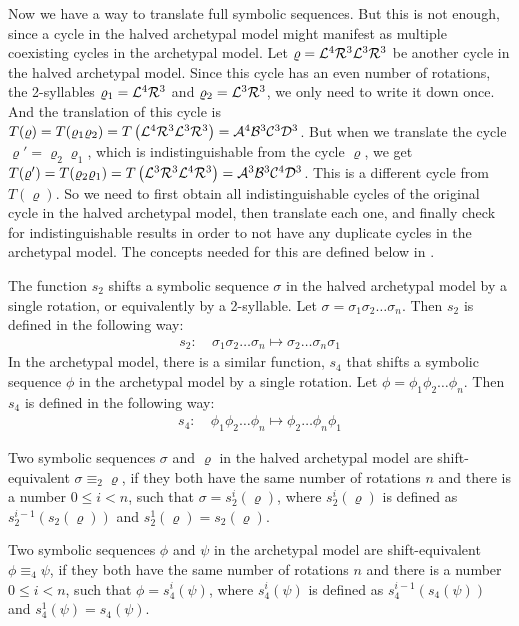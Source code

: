 Now we have a way to translate full symbolic sequences.
But this is not enough, since a cycle in the halved archetypal model might manifest as multiple coexisting cycles in the archetypal model.
Let $\varrho = \mathcal{L}^4\mathcal{R}^3\mathcal{L}^3\mathcal{R}^3$ be another cycle in the halved archetypal model.
Since this cycle has an even number of rotations, the 2-syllables $\varrho_1 = \mathcal{L}^4\mathcal{R}^3$ and $\varrho_2 = \mathcal{L}^3\mathcal{R}^3$, we only need to write it down once.
And the translation of this cycle is $T(\varrho) = T(\varrho_1\varrho_2) = T\left(\mathcal{L}^4\mathcal{R}^3\mathcal{L}^3\mathcal{R}^3\right) = \mathcal{A}^4\mathcal{B}^3\mathcal{C}^3\mathcal{D}^3$.
But when we translate the cycle $\varrho' = \varrho_2\varrho_1$, which is indistinguishable from the cycle $\varrho$, we get $T(\varrho') = T(\varrho_2\varrho_1) = T\left(\mathcal{L}^3\mathcal{R}^3\mathcal{L}^4\mathcal{R}^3\right) = \mathcal{A}^3\mathcal{B}^3\mathcal{C}^4\mathcal{D}^3$.
This is a different cycle from $T(\varrho)$.
So we need to first obtain all indistinguishable cycles of the original cycle in the halved archetypal model, then translate each one, and finally check for indistinguishable results in order to not have any duplicate cycles in the archetypal model.
The concepts needed for this are defined below in .

\begin{definition}
	\label{def:shifting}
	The function $s_2$ shifts a symbolic sequence $\sigma$ in the halved archetypal model by a single rotation, or equivalently by a 2-syllable.
	Let $\sigma = \sigma_1\sigma_2 \dots \sigma_n$.
	Then $s_2$ is defined in the following way:
	\begin{align}
		s_2:\: & \sigma_1\sigma_2 \dots \sigma_n \mapsto \sigma_2 \dots \sigma_n\sigma_1
	\end{align}
	In the archetypal model, there is a similar function, $s_4$ that shifts a symbolic sequence $\phi$ in the archetypal model by a single rotation.
	Let $\phi = \phi_1\phi_2 \dots \phi_n$.
	Then $s_4$ is defined in the following way:
	\begin{align}
		s_4:\: & \phi_1\phi_2 \dots \phi_n \mapsto \phi_2 \dots \phi_n\phi_1
	\end{align}
\end{definition}

\begin{definition}
	\label{def:shift.equiv}
	Two symbolic sequences $\sigma$ and $\varrho$ in the halved archetypal model are shift-equivalent $\sigma \equiv_2 \varrho$,
	if they both have the same number of rotations $n$
	and there is a number $0 \leq i < n$, such that $\sigma = s_2^i(\varrho)$,
	where $s_2^i(\varrho)$ is defined as $s_2^{i-1}(s_2(\varrho))$ and $s_2^1(\varrho) = s_2(\varrho)$.

	Two symbolic sequences $\phi$ and $\psi$ in the archetypal model are shift-equivalent $\phi \equiv_4 \psi$,
	if they both have the same number of rotations $n$
	and there is a number $0 \leq i < n$, such that $\phi = s_4^i(\psi)$,
	where $s_4^i(\psi)$ is defined as $s_4^{i-1}(s_4(\psi))$ and $s_4^1(\psi) = s_4(\psi)$.
\end{definition}

